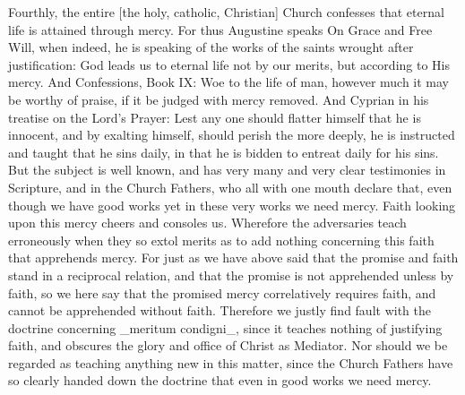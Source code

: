 Fourthly, the entire [the holy, catholic, Christian] Church confesses
that eternal life is attained through mercy.  For thus Augustine
speaks On Grace and Free Will, when indeed, he is speaking of the
works of the saints wrought after justification: God leads us to
eternal life not by our merits, but according to His mercy.  And
Confessions, Book IX: Woe to the life of man, however much it may be
worthy of praise, if it be judged with mercy removed.  And Cyprian in
his treatise on the Lord's Prayer: Lest any one should flatter
himself that he is innocent, and by exalting himself, should perish
the more deeply, he is instructed and taught that he sins daily, in
that he is bidden to entreat daily for his sins.  But the subject is
well known, and has very many and very clear testimonies in Scripture,
and in the Church Fathers, who all with one mouth declare that, even
though we have good works yet in these very works we need mercy.
Faith looking upon this mercy cheers and consoles us.  Wherefore the
adversaries teach erroneously when they so extol merits as to add
nothing concerning this faith that apprehends mercy.  For just as we
have above said that the promise and faith stand in a reciprocal
relation, and that the promise is not apprehended unless by faith, so
we here say that the promised mercy correlatively requires faith, and
cannot be apprehended without faith.  Therefore we justly find fault
with the doctrine concerning _meritum condigni_, since it teaches
nothing of justifying faith, and obscures the glory and office of
Christ as Mediator.  Nor should we be regarded as teaching anything
new in this matter, since the Church Fathers have so clearly handed
down the doctrine that even in good works we need mercy.

